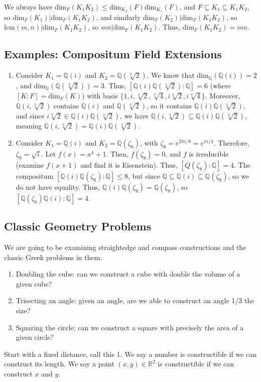 \documentclass[10pt]{extarticle}
\newcommand{\Q}{\mathbb{Q}}
\newcommand{\R}{\mathbb{R}}
\begin{document}
  We always have $\text{dim}_{F}(K_1K_2) \leq \text{dim}_{K_2}(F)\text{dim}_{K_1}(F)$, and $F\subseteq K_1\subseteq K_1K_2$, so $\text{dim}_{F}(K_1)|\text{dim}_{F}(K_1K_2)$, and similarly $\text{dim}_{F}(K_2)|\text{dim}_{F}(K_1K_2)$, so $\text{lcm}(m,n)|\text{dim}_{F}(K_1K_2)$, so $mn|\text{dim}_{F}(K_1K_2)$. Thus, $\text{dim}_{F}(K_1K_2) = mn$.
  \subsection{Examples: Compositum Field Extensions}%
  \begin{enumerate}[(1)]
    \item Consider $K_1 = \Q(i)$ and $K_2 = \Q(\sqrt[3]{2})$. We know that $\text{dim}_{\Q}(\Q(i)) = 2$, and $\text{dim}_{\Q}(\Q(\sqrt[3]{2})) = 3$. Thus, $[\Q(i)\Q(\sqrt[3]{2}):\Q] = 6$ (where $[K:F] = \text{dim}_F(K)$) with basis $\{1,i,\sqrt[3]{2},\sqrt[3]{4},i\sqrt[3]{2},i\sqrt[3]{4}\}$. Moreover, $\Q(i,\sqrt[3]{2})$ contains $\Q(i)$ and $\Q(\sqrt[3]{2})$, so it contains $\Q(i)\Q(\sqrt[3]{2})$, and since $i\sqrt[3]{2}\in \Q(i)\Q(\sqrt[3]{2})$, we have $\Q(i,\sqrt[3]{2})\subseteq \Q(i)\Q(\sqrt[3]{2})$, meaning $\Q(i,\sqrt[3]{2}) = \Q(i)\Q(\sqrt[3]{2})$.
    \item Consider $K_1 = \Q(i)$ and $K_2 = \Q(\zeta_8)$, with $\zeta_8 = e^{2\pi i/8} = e^{\pi i/4}$. Therefore, $\zeta_8 = \sqrt{i}$. Let $f(x) = x^4 + 1$. Then, $f(\zeta_8) = 0$, and $f$ is irreducible (examine $f(x+1)$ and find it is Eisenstein). Thus, $[Q(\zeta_8):\Q] = 4$. The compositum $[\Q(i)\Q(\zeta_8):\Q] \leq 8$, but since $\Q\subseteq \Q(i)\subseteq \Q(\zeta_8)$, so we do not have equality. Thus, $\Q(i)\Q(\zeta_8) = \Q(\zeta_8)$, so $[\Q(\zeta_8)\Q(i) : \Q] = 4$.
  \end{enumerate}
  \subsection{Classic Geometry Problems}%
  We are going to be examining straightedge and compass constructions and the classic Greek problems in them.
  \begin{enumerate}[(1)]
    \item Doubling the cube: can we construct a cube with double the volume of a given cube?
    \item Trisecting an angle: given an angle, are we able to construct an angle 1/3 the size?
    \item Squaring the circle; can we construct a square with precisely the area of a given circle?
  \end{enumerate}
  Start with a fixed distance, call this $1$. We say a number is constructible if we can construct its length. We say a point $(x,y)\in \R^2$ is constructible if we can construct $x$ and $y$.\\
\end{document}
